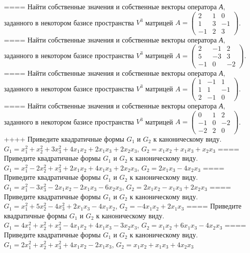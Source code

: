 ====
Найти собственные значения и собственные векторы оператора \emph{А}, заданного в некотором базисе пространства \(V^{3}\) матрицей \(A = \begin{pmatrix}
2 & 1 & 0 \\
1 & 3 & - 1 \\
 - 1 & 2 & 3
\end{pmatrix}\).
====
Найти собственные значения и собственные векторы оператора \emph{А}, заданного в некотором базисе пространства \(V^{3}\) матрицей \(A = \begin{pmatrix}
2 & - 1 & 2 \\
5 & - 3 & 3 \\
 - 1 & 0 & - 2
\end{pmatrix}\).
====
Найти собственные значения и собственные векторы оператора \emph{А}, заданного в некотором базисе пространства \(V^{3}\) матрицей \(A = \begin{pmatrix}
1 & - 1 & 1 \\
1 & 1 & - 1 \\
2 & - 1 & 0
\end{pmatrix}\).
====
Найти собственные значения и собственные векторы оператора \emph{А}, заданного в некотором базисе пространства \(V^{3}\) матрицей \(A = \begin{pmatrix}
0 & 1 & 2 \\
 - 1 & 0 & - 2 \\
 - 2 & 2 & 0
\end{pmatrix}\).
++++
Приведите квадратичные формы \(G_{1}\) и \(G_{2}\) к каноническому виду. \(G_{1} = x_{1}^{2} + x_{2}^{2} + 3x_{3}^{2} + 4x_{1}x_{2} + 2x_{1}x_{3} + 2x_{2}x_{3}\), \(G_{2} = x_{1}x_{2} + x_{1}x_{3} + x_{2}x_{3}\)
====
Приведите квадратичные формы \(G_{1}\) и \(G_{2}\) к каноническому виду. \(G_{1} = x_{1}^{2} - 2x_{2}^{2} + x_{3}^{2} + 2x_{1}x_{2} + 4x_{1}x_{3} + 2x_{2}x_{3}\), \(G_{2} = 2x_{1}x_{3} - 4x_{2}x_{3}\)
====
Приведите квадратичные формы \(G_{1}\) и \(G_{2}\) к каноническому виду. \(G_{1} = x_{1}^{2} - 3x_{3}^{2} - 2x_{1}x_{2} - 2x_{1}x_{3} - 6x_{2}x_{3}\), \(G_{2} = 2x_{1}x_{2} - x_{1}x_{3} + 2x_{2}x_{3}\)
====
Приведите квадратичные формы \(G_{1}\) и \(G_{2}\) к каноническому виду. \(G_{1} = x_{1}^{2} + 5x_{2}^{2} - 4x_{3}^{2} + 2x_{1}x_{3} - 4x_{1}x_{2}\), \(G_{2} = - 4x_{1}x_{2} + 2x_{1}x_{3}\)
====
Приведите квадратичные формы \(G_{1}\) и \(G_{2}\) к каноническому виду. \(G_{1} = 4x_{1}^{2} + x_{2}^{2} + x_{3}^{2} - 4x_{1}x_{2} + 4x_{1}x_{3} - 3x_{2}x_{3}\), \(G_{2} = x_{1}x_{2} + 6x_{1}x_{3} - 4x_{2}x_{3}\)
====
Приведите квадратичные формы \(G_{1}\) и \(G_{2}\) к каноническому виду. \(G_{1} = 2x_{1}^{2} + x_{2}^{2} + x_{3}^{2} + 4x_{1}x_{2} - 2x_{1}x_{3}\), \(G_{2} = x_{1}x_{2} + x_{1}x_{3} + 4x_{2}x_{3}\)
